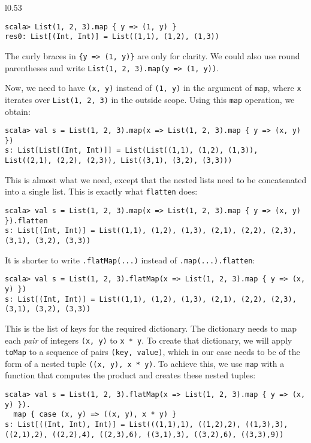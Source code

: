 \begin{wrapfigure}{l}{0.53\columnwidth}%
\vspace{-0.75\baselineskip}
\begin{lstlisting}
scala> List(1, 2, 3).map { y => (1, y) }
res0: List[(Int, Int)] = List((1,1), (1,2), (1,3))
\end{lstlisting}
\vspace{-1.5\baselineskip}
\end{wrapfigure}%

\noindent The curly braces in \lstinline!{y => (1, y)}! are only
for clarity. We could also use round parentheses and write \lstinline!List(1, 2, 3).map(y => (1, y))!. 

Now, we need to have \lstinline!(x, y)! instead of \lstinline!(1, y)!
in the argument of \lstinline!map!, where \lstinline!x! iterates
over \lstinline!List(1, 2, 3)! in the outside scope. Using this \lstinline!map!
operation, we obtain:
\begin{lstlisting}
scala> val s = List(1, 2, 3).map(x => List(1, 2, 3).map { y => (x, y) })
s: List[List[(Int, Int)]] = List(List((1,1), (1,2), (1,3)), List((2,1), (2,2), (2,3)), List((3,1), (3,2), (3,3)))
\end{lstlisting}
This is almost what we need, except that the nested lists need to
be concatenated into a single list. This is exactly what \lstinline!flatten!
does:
\begin{lstlisting}
scala> val s = List(1, 2, 3).map(x => List(1, 2, 3).map { y => (x, y) }).flatten
s: List[(Int, Int)] = List((1,1), (1,2), (1,3), (2,1), (2,2), (2,3), (3,1), (3,2), (3,3))
\end{lstlisting}
It is shorter to write \lstinline!.flatMap(...)! instead of \lstinline!.map(...).flatten!:
\begin{lstlisting}
scala> val s = List(1, 2, 3).flatMap(x => List(1, 2, 3).map { y => (x, y) })
s: List[(Int, Int)] = List((1,1), (1,2), (1,3), (2,1), (2,2), (2,3), (3,1), (3,2), (3,3)) 
\end{lstlisting}
This is the list of keys for the required dictionary. The dictionary
needs to map each \emph{pair} of integers \lstinline!(x, y)! to \lstinline!x * y!.
To create that dictionary, we will apply \lstinline!toMap! to a sequence
of pairs \lstinline!(key, value)!, which in our case needs to be
of the form of a nested tuple \lstinline!((x, y), x * y)!. To achieve
this, we use \lstinline!map! with a function that computes the product
and creates these nested tuples:
\begin{lstlisting}
scala> val s = List(1, 2, 3).flatMap(x => List(1, 2, 3).map { y => (x, y) }).
  map { case (x, y) => ((x, y), x * y) }
s: List[((Int, Int), Int)] = List(((1,1),1), ((1,2),2), ((1,3),3), ((2,1),2), ((2,2),4), ((2,3),6), ((3,1),3), ((3,2),6), ((3,3),9))
\end{lstlisting}
